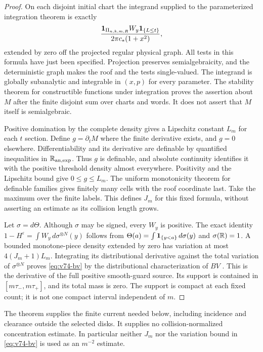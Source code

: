 \begin{proof}
On each disjoint initial chart the integrand supplied to the
parameterized integration theorem is exactly
\[
 \frac{\mathbf1_{\Pi_{n,k,m,R}}W_y\mathbf1_{\{L\le t\}}}
                         {2\pi c_*(1+x^2)},
\]
extended by zero off the projected regular physical graph.
All tests in this formula have just been specified. Projection
preserves semialgebraicity, and the deterministic graph makes the
roof and the tests single-valued. The integrand is globally
subanalytic and integrable in $(x,p)$ for every parameter.
The stability theorem for constructible functions under integration
\cite[Theorem 1.3]{CMInt} proves the assertion about $M$ after the
finite disjoint sum over charts and words. It does not assert that
$M$ itself is semialgebraic.

Positive domination by the complete density gives a Lipschitz
constant $L_m$ for each $t$ section. Define $g=\partial_tM$ where
the finite derivative exists, and $g=0$ elsewhere. Differentiability
and its derivative are definable by quantified inequalities in
$\mathbb R_{\mathrm{an},\exp}$. Thus $g$ is definable, and absolute
continuity identifies it with the positive threshold density almost
everywhere. Positivity and the Lipschitz bound give $0\le g\le L_m$.
The uniform monotonicity theorem for definable families
\cite{Coste} gives finitely many cells with the roof coordinate
last. Take the maximum over the finite labels. This defines $J_m$
for this fixed formula, without asserting an estimate as its
collision length grows.

Let $\sigma=d\Theta$. Although $\sigma$ may be signed, every $W_y$
is positive. The exact identity
$1-H^\varepsilon=\int W_y\,d\sigma^{\otimes N}(y)$ follows from
$\Theta(a)=\int\mathbf1_{\{y<a\}}\,d\sigma(y)$ and $\sigma(\mathbb R)=1$.
A bounded monotone-piece density extended by zero has variation
at most $4(J_m+1)L_m$. Integrating its distributional derivative
against the total variation of $\sigma^{\otimes N}$ proves
\eqref{eq:v74-bv} by the distributional characterization of $BV$
\cite{AFP}. This is the derivative of the full positive smooth-guard
source. Its support is contained in $[m\tau_-,m\tau_+]$, and its
total mass is zero. The support is compact at each fixed count;
it is not one compact interval independent of $m$.
\end{proof}

The theorem supplies the finite current needed below, including
incidence and clearance outside the selected disks. It supplies no
collision-normalized concentration estimate. In particular neither
$J_m$ nor the variation bound in \eqref{eq:v74-bv} is used as an
$m^{-2}$ estimate.
